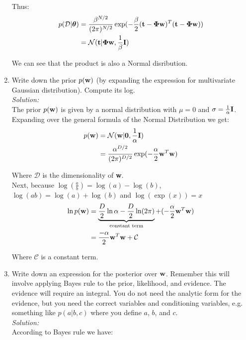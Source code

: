 \documentclass[12pt,a4paper]{article}
\newcommand{\Data}{\mathcal{D}}
\newcommand{\eye}{{\bf I}}
\newcommand{\tscalar}{t}
\newcommand{\tvec}{{\bf \tscalar}}
\newcommand{\wscalar}{w}
\newcommand{\wvec}{{\bf \wscalar}}
\newcommand{\zerovec}{ {\bf 0}}
\newcommand{\thetavec}{\boldsymbol{\theta}}
\newcommand{\thetav}{\thetavec}
\newcommand{\Phimat}{\boldsymbol{\Phi}}
\begin{document}
\begin{enumerate}
		  Thus: \\
		  
		  \begin{align*}
		  p(\Data | \thetav) &=  \frac{\beta^{N/2}}{(2\pi)^{N/2}} \exp (-\frac{\beta}{2}(\tvec - \Phimat \wvec)^T(\tvec - \Phimat \wvec))\\
		  &=\mathcal{N}(\tvec | \Phimat \wvec, \frac{1}{\beta} \eye )
		  \end{align*}
		  
		  We can see that the product is also a Normal disribution. \\
		  
	  
  \item Write down the prior $p(\wvec)$ (by expanding the expression for multivariate Gaussian distribution).  Compute its log.\\
	  \emph{Solution:} \\
		  The prior $p(\wvec)$ is given by a normal distribution with $\mu = 0$ and $\sigma = \frac{1}{\alpha}\eye$. Expanding over the general formula of the Normal Distribution we get: \\
		  
		  \begin{align*}
		  p(\wvec) &= \mathcal{N}(\wvec | \zerovec, \frac{1}{\alpha}\eye) \\
		  &= \frac{\alpha^{D/2}}{(2\pi)^{D/2}} \exp (- \frac{\alpha}{2} \wvec^T \wvec)
		  \end{align*}
		  
		  Where $\mathcal{D}$ is the dimensionality of \textbf{w}. \\
		  
		  Next, because $\log(\frac{a}{b}) = \log(a) - \log(b)$, $\log(ab) = \log(a) + \log(b)$ and $\log(\exp(x)) = x$ \\
		  
		  \begin{align*}
		  \ln p(\wvec) &= \underbrace{\frac{D}{2} \ln \alpha - \frac{D}{2} \ln (2 \pi)}_{\text{constant term}} + (- \frac{\alpha}{2}\wvec^T \wvec) \\
		  &= \frac{- \alpha}{2} \wvec^T \wvec + \mathcal{C}
		  \end{align*}
		  
		  Where $\mathcal{C}$ is a constant term. \\
  
  \item Write down an expression for the posterior over $\wvec$.  Remember this will involve applying Bayes rule to the prior, likelihood, and evidence.  The evidence will require an integral.  You do not need the analytic form for the evidence, but you need the correct variables and conditioning variables, e.g. something like $p(a|b,c)$ where you define $a$, $b$, and $c$.\\
	  \emph{Solution:} \\
		  According to Bayes rule we have:
		  

\end{enumerate}
\end{document}
